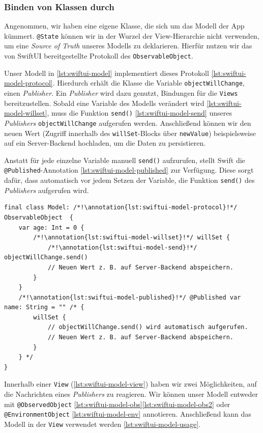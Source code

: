 \subsubsection{Binden von Klassen durch }

Angenommen, wir haben eine eigene Klasse, die sich um das Modell der App kümmert. \texttt{@State} können wir in der Wurzel der View-Hierarchie nicht verwenden, um eine \emph{Source of Truth} unseres Modells zu deklarieren. Hierfür nutzen wir das von SwiftUI bereitgestellte Protokoll des \texttt{ObservableObject}.

Unser Modell in \autoref{lst:swiftui-model} implementiert dieses Protokoll \ref*{lst:swiftui-model-protocol}. Hierdurch erhält die Klasse die Variable \texttt{objectWillChange}, einen \emph{Publisher}. Ein \emph{Publisher} wird dazu genutzt, Bindungen für die \texttt{Views} bereitzustellen. Sobald eine Variable des Modells verändert wird \ref*{lst:swiftui-model-willset}, muss die Funktion \texttt{send()} \ref*{lst:swiftui-model-send} unseres \emph{Publishers} \texttt{objectWillChange} aufgerufen werden. Anschließend können wir den neuen Wert (Zugriff innerhalb des \texttt{willSet}-Blocks über \texttt{newValue}) beispielsweise auf ein Server-Backend hochladen, um die Daten zu persistieren.

Anstatt für jede einzelne Variable manuell \texttt{send()} aufzurufen, stellt Swift die \texttt{@Published}-Annotation \ref*{lst:swiftui-model-published} zur Verfügung. Diese sorgt dafür, dass automatisch vor jedem Setzen der Variable, die Funktion \texttt{send()} des \emph{Publishers} aufgerufen wird.

\begin{lstlisting}[caption={Model.swift},label={lst:swiftui-model}]
final class Model: /*!\annotation{lst:swiftui-model-protocol}!*/ ObservableObject  {
    var age: Int = 0 {
        /*!\annotation{lst:swiftui-model-willset}!*/ willSet {
            /*!\annotation{lst:swiftui-model-send}!*/ objectWillChange.send()
            // Neuen Wert z. B. auf Server-Backend abspeichern.
        }
    }
    /*!\annotation{lst:swiftui-model-published}!*/ @Published var name: String = "" /* {
        willSet {
            // objectWillChange.send() wird automatisch aufgerufen.
            // Neuen Wert z. B. auf Server-Backend abspeichern.
        }
    } */
}
\end{lstlisting}\setcounter{lstannotation}{0}

Innerhalb einer \texttt{View} (\autoref{lst:swiftui-model-view}) haben wir zwei Möglichkeiten, auf die Nachrichten eines \emph{Publishers} zu reagieren. Wir können unser Modell entweder mit \texttt{@ObservedObject} \ref*{lst:swiftui-model-obs}\ref*{lst:swiftui-model-obs2} oder \texttt{@EnvironmentObject} \ref*{lst:swiftui-model-env} annotieren. Anschließend kann das Modell in der \texttt{View} verwendet werden \ref*{lst:swiftui-model-usage}. 

